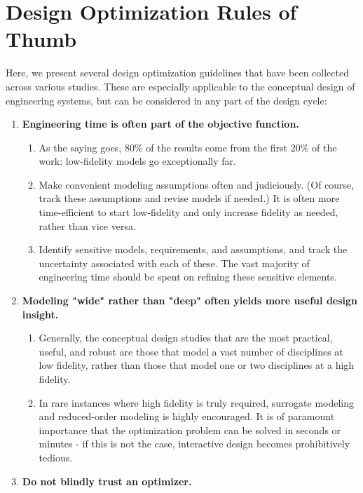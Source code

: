 \chapter{Design Optimization Rules of Thumb}

Here, we present several design optimization guidelines that have been collected across various studies. These are especially applicable to the conceptual design of engineering systems, but can be considered in any part of the design cycle:

\begin{enumerate}
    \item \textbf{Engineering time is often part of the objective function.}
    \begin{enumerate}
        \item As the saying goes, 80\% of the results come from the first 20\% of the work: low-fidelity models go exceptionally far.
        \item Make convenient modeling assumptions often and judiciously. (Of course, track these assumptions and revise models if needed.) It is often more time-efficient to start low-fidelity and only increase fidelity as needed, rather than vice versa.
        \item Identify sensitive models, requirements, and assumptions, and track the uncertainty associated with each of these. The vast majority of engineering time should be spent on refining these sensitive elements.
    \end{enumerate}
    \item \textbf{Modeling "wide" rather than "deep" often yields more useful design insight.}
    \begin{enumerate}
        \item Generally, the conceptual design studies that are the most practical, useful, and robust are those that model a vast number of disciplines at low fidelity, rather than those that model one or two disciplines at a high fidelity.
        \item In rare instances where high fidelity is truly required, surrogate modeling and reduced-order modeling is highly encouraged. It is of paramount importance that the optimization problem can be solved in seconds or minutes - if this is not the case, interactive design becomes prohibitively tedious.
    \end{enumerate}
    \item \textbf{Do not blindly trust an optimizer.}
    \begin{enumerate}

\end{enumerate}
\end{enumerate}
